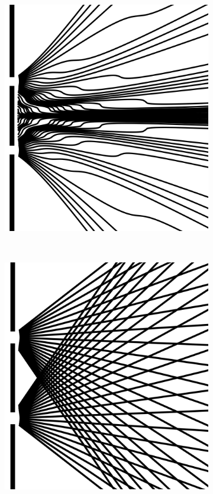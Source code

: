 \documentclass[11pt]{article}
\numberwithin{equation}{section}
\begin{document}
\begin{figure}[H]
 		\centering
 		\begin{subfigure}[b]{0.3\textwidth}
 	  			\includegraphics[width=\textwidth]{interference.png}
   				\caption{}
   				\label{fig:s1}
 		\end{subfigure}
 		~
 		\begin{subfigure}[b]{0.3\textwidth}
   				\includegraphics[width=\textwidth]{straight.png}

\end{subfigure}
\end{figure}
\end{document}
